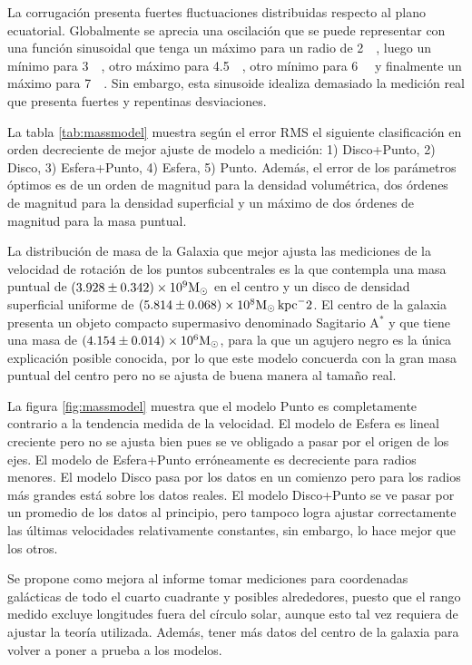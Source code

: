 La corrugación presenta fuertes fluctuaciones distribuidas respecto al plano ecuatorial. Globalmente se aprecia una oscilación que se puede representar con una función sinusoidal que tenga un máximo para un radio de \SI{2}{\kilo\parsec}, luego un mínimo para \SI{3}{\kilo\parsec}, otro máximo para \SI{4.5}{\kilo\parsec}, otro mínimo para \SI{6}{\kilo\parsec} y finalmente un máximo para \SI{7}{\kilo\parsec}. Sin embargo, esta sinusoide idealiza demasiado la medición real que presenta fuertes y repentinas desviaciones.

La tabla \ref{tab:massmodel} muestra según el error RMS el siguiente clasificación en orden decreciente de mejor ajuste de modelo a medición: 1) Disco+Punto, 2) Disco, 3) Esfera+Punto, 4) Esfera, 5) Punto. Además, el error de los parámetros óptimos es de un orden de magnitud para la densidad volumétrica, dos órdenes de magnitud para la densidad superficial y un máximo de dos órdenes de magnitud para la masa puntual.

La distribución de masa de la Galaxia que mejor ajusta las mediciones de la velocidad de rotación de los puntos subcentrales es la que contempla una masa puntual de $(3.928\pm0.342)\times10^9\textnormal{M}_\odot$ en el centro y un disco de densidad superficial uniforme de $(5.814\pm0.068)\times10^8\textnormal{M}_\odot\,\textnormal{kpc}^-2$. El centro de la galaxia presenta un objeto compacto supermasivo denominado Sagitario A$^\ast$ y que tiene una masa de $(4.154\pm0.014)\times10^6\textnormal{M}_\odot$, para la que un agujero negro es la única explicación posible conocida, por lo que este modelo concuerda con la gran masa puntual del centro pero no se ajusta de buena manera al tamaño real.

La figura \ref{fig:massmodel} muestra que el modelo Punto es completamente contrario a la tendencia medida de la velocidad. El modelo de Esfera es lineal creciente pero no se ajusta bien pues se ve obligado a pasar por el origen de los ejes. El modelo de Esfera+Punto erróneamente es decreciente para radios menores. El modelo Disco pasa por los datos en un comienzo pero para los radios más grandes está sobre los datos reales. El modelo Disco+Punto se ve pasar por un promedio de los datos al principio, pero tampoco logra ajustar correctamente las últimas velocidades relativamente constantes, sin embargo, lo hace mejor que los otros.

Se propone como mejora al informe tomar mediciones para coordenadas galácticas de todo el cuarto cuadrante y posibles alrededores, puesto que el rango medido excluye longitudes fuera del círculo solar, aunque esto tal vez requiera de ajustar la teoría utilizada. Además, tener más datos del centro de la galaxia para volver a poner a prueba a los modelos.
